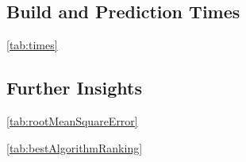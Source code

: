 \subsection{Build and Prediction Times}


\ref{tab:times}

\subsection{Further Insights}


\ref{tab:rootMeanSquareError}



\ref{tab:bestAlgorithmRanking}







